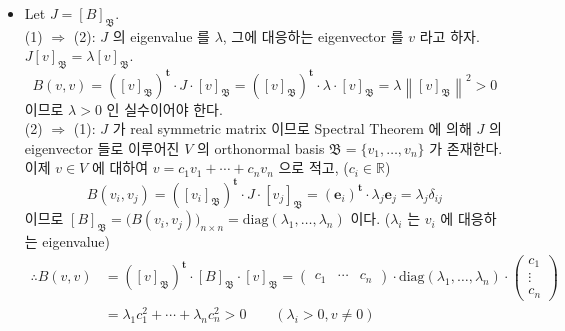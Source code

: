 \documentclass[12pt]{report}
\newcommand{\numl}[1]{\item[\large\textbf{\sffamily #1}]}
\newcommand{\mf}[1]{\mathfrak{#1}}
\newcommand{\bb}[1]{\mathbb{#1}}
\newcommand{\rmbf}[1]{\mathrm{\mathbf{#1}}}
\newcommand{\trans}{^{\mathrm{\mathbf{t}}}}
\newcommand{\norm}[1]{\left\lVert#1\right\rVert}
\newcommand{\diag}{\text{diag}}
\begin{document}
\begin{itemize}
\begin{itemize}
	\end{itemize}

\numl{15.3.11} Let $J = [B]_\mf{B}$.\\
{\sffamily (1) $\Rightarrow$ (2)}: $J$ 의 eigenvalue 를 $\lambda$, 그에 대응하는 eigenvector 를 $v$ 라고 하자. $J[v]_\mf{B} = \lambda [v]_\mf{B}$. $$B(v, v) = ([v]_\mf{B})\trans \cdot J \cdot[v]_\mf{B} = ([v]_\mf{B})\trans \cdot \lambda \cdot [v]_\mf{B} = \lambda \norm{[v]_\mf{B}}^2>0$$ 이므로 $\lambda > 0$ 인 실수이어야 한다.\\
{\sffamily (2) $\Rightarrow$ (1)}: $J$ 가 real symmetric matrix 이므로 Spectral Theorem 에 의해 $J$ 의 eigenvector 들로 이루어진 $V$ 의 orthonormal basis $\mf{B}=\{v_1, \dots, v_n\}$ 가 존재한다. 이제 $v\in V$ 에 대하여 $v = c_1v_1 +\cdots + c_nv_n$ 으로 적고, ($c_i\in \bb{R}$)
$$B(v_i, v_j) = ([v_i]_\mf{B})\trans \cdot J \cdot [v_j]_\mf{B} = (\rmbf{e}_i)\trans\cdot \lambda_j \rmbf{e}_j = \lambda_j \delta_{ij}$$
이므로 $[B]_\mf{B} = \big(B(v_i, v_j)\big)_{n\times n} = \diag(\lambda_1, \dots, \lambda_n)$ 이다. ($\lambda_i$ 는 $v_i$ 에 대응하는 eigenvalue)
$$\begin{aligned}
\therefore B(v, v) &= ([v]_\mf{B})\trans \cdot [B]_\mf{B}\cdot [v]_\mf{B} = \begin{pmatrix}
c_1 & \cdots & c_n
\end{pmatrix}\cdot \diag(\lambda_1, \dots, \lambda_n) \cdot \begin{pmatrix}
c_1\\\vdots\\c_n
\end{pmatrix} \\&= \lambda_1 c_1^2+\cdots +\lambda_nc_n^2>0	
\qquad (\lambda_i > 0, v\neq 0) \end{aligned} $$


\end{itemize}
\end{document}
